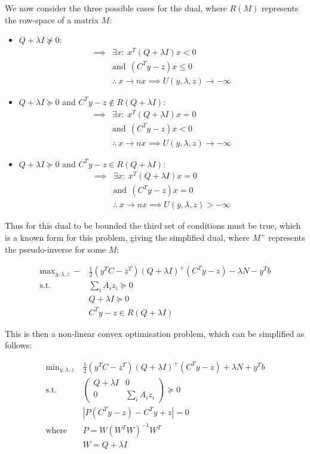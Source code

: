 \documentclass{article}
\begin{document}
We now consider the three possible cases for the dual, where $R(M)$ represents the row-space of a matrix $M$:

\begin{itemize}
\item $Q+\lambda I \not\succeq 0$:
	\begin{align}
		\implies &\exists x : ~ x^T (Q + \lambda I) x < 0 \\
				 &\text{and} ~~ (C^Ty-z)x \le 0 \\
		&\therefore ~ x \to n x \implies U(y, \lambda, z) \to -\infty
	\end{align}
\item $Q+\lambda I \succeq 0$ and $C^Ty-z \not \in R(Q+\lambda I)$:
	\begin{align}
		\implies &\exists x : ~ x^T (Q + \lambda I) x = 0 \\
				 &\text{and} ~~ (C^Ty-z)x < 0 \\
		&\therefore ~ x \to n x \implies U(y, \lambda, z) \to -\infty
	\end{align}
\item $Q+\lambda I \succeq 0$ and $C^Ty-z \in R(Q+\lambda I)$:
	\begin{align}
		\implies &\exists x : ~ x^T (Q + \lambda I) x = 0 \\
				 &\text{and} ~~ (C^Ty-z)x = 0 \\
				 &\therefore ~ x \to n x \implies U(y, \lambda, z) > -\infty
	\end{align}
\end{itemize}

Thus for this dual to be bounded the third set of conditions must be true, which is a known form for this problem, giving the simplified dual, where $M^+$ represents the pseudo-inverse for some $M$:

\begin{align}
	\text{max}_{y, \lambda, z} ~ -&\frac{1}{2} (y^T C - z^T) (Q+\lambda I)^+ (C^Ty - z) - \lambda N - y^T b \\ 
	\text{s.t.} ~~ &\sum_i A_i z_i \succeq 0 \\
				&Q+ \lambda I \succeq 0 \\
				&C^Ty-z \in R(Q+\lambda I)
\end{align}

\pagebreak 

This is then a non-linear convex optimisation problem, which can be simplified as follows:

\begin{align}
	\text{min}_{y, \lambda, z} ~ &\frac{1}{2} (y^T C - z^T) (Q+\lambda I)^+ (C^Ty - z) + \lambda N + y^T b \\ 
	\text{s.t.} ~~ &\begin{pmatrix} Q+ \lambda I & 0 \\ 0 & \sum_i A_i z_i \end{pmatrix} \succeq 0 \\
			    &|P(C^Ty-z)-C^Ty+z| = 0 \\ 
				\text{where} ~~ &P = W (W^T W)^{-1} W^T \\
								&W = Q+\lambda I
\end{align}
\end{document}
